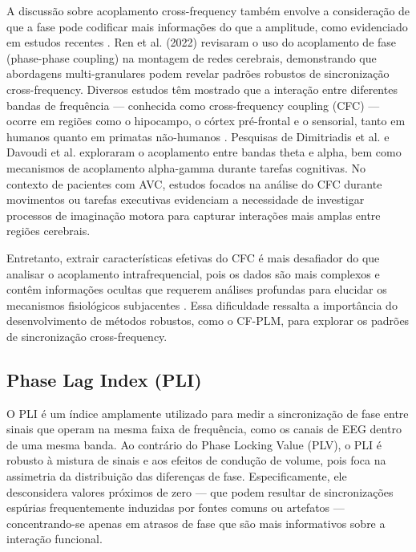A discussão sobre acoplamento cross-frequency também envolve a consideração de que a fase pode codificar mais informações do que a amplitude, como evidenciado em estudos recentes \cite{autor2020}. Ren et al. (2022) \cite{ren2022multi} revisaram o uso do acoplamento de fase (phase-phase coupling) na montagem de redes cerebrais, demonstrando que abordagens multi-granulares podem revelar padrões robustos de sincronização cross-frequency. Diversos estudos têm mostrado que a interação entre diferentes bandas de frequência — conhecida como cross-frequency coupling (CFC) — ocorre em regiões como o hipocampo, o córtex pré-frontal e o sensorial, tanto em humanos quanto em primatas não-humanos \cite{mormann2005phase, canolty2006high, jensen2007cross, khamechian2020decoding}. Pesquisas de Dimitriadis et al. \cite{dimitriadis2015cognitive} e Davoudi et al. \cite{davoudi2021prefrontal} exploraram o acoplamento entre bandas theta e alpha, bem como mecanismos de acoplamento alpha-gamma durante tarefas cognitivas. No contexto de pacientes com AVC, estudos focados na análise do CFC durante movimentos ou tarefas executivas evidenciam a necessidade de investigar processos de imaginação motora para capturar interações mais amplas entre regiões cerebrais.

Entretanto, extrair características efetivas do CFC é mais desafiador do que analisar o acoplamento intrafrequencial, pois os dados são mais complexos e contêm informações ocultas que requerem análises profundas para elucidar os mecanismos fisiológicos subjacentes \cite{ren2022multi}. Essa dificuldade ressalta a importância do desenvolvimento de métodos robustos, como o CF-PLM, para explorar os padrões de sincronização cross-frequency.

\subsection{Phase Lag Index (PLI)}

O PLI é um índice amplamente utilizado para medir a sincronização de fase entre sinais que operam na mesma faixa de frequência, como os canais de EEG dentro de uma mesma banda. Ao contrário do Phase Locking Value (PLV), o PLI é robusto à mistura de sinais e aos efeitos de condução de volume, pois foca na assimetria da distribuição das diferenças de fase. Especificamente, ele desconsidera valores próximos de zero — que podem resultar de sincronizações espúrias frequentemente induzidas por fontes comuns ou artefatos — concentrando-se apenas em atrasos de fase que são mais informativos sobre a interação funcional.

